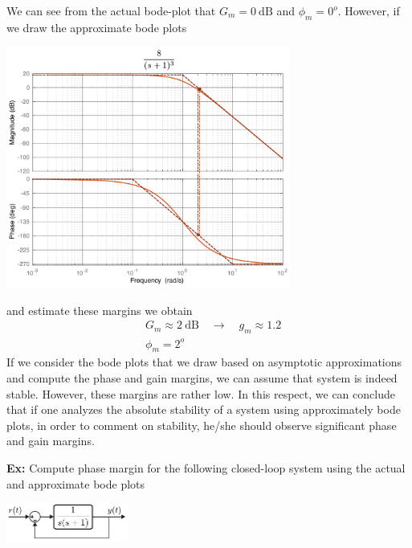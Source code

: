 \documentclass[twoside]{article}
\begin{document}
We can see from the actual bode-plot that  $G_m =  0 \ \mathrm{dB}$
and $\phi_m = 0^o$.
However, if we draw the approximate bode plots 

\begin{center}
\begin{minipage}[h]{\linewidth}
    \begin{center}
      \includegraphics[width=0.7\textwidth]{margin3}
    \end{center}
\end{minipage}
\end{center}

and estimate these margins we obtain
%
\begin{align*}
	&G_m \approx 2 \ \mathrm{dB} \quad \rightarrow \quad g_m \approx 1.2	
	\\
	&\phi_m = 2^o
\end{align*}
%
If we consider the bode plots that we draw based on asymptotic approximations and compute the phase and gain margins, we can assume that system is indeed stable. However, these margins are rather low. In this respect, we can conclude that if one analyzes the absolute stability of a system using approximately bode plots, in order to comment on stability, he/she should observe significant phase and gain margins.

\textbf{Ex:} Compute  phase margin for the following closed-loop system 
using the actual and approximate bode plots

\begin{center}
\begin{minipage}[h]{\linewidth}
    \begin{center}
      \includegraphics[width=0.3\textwidth]{ex4block}
    \end{center}
\end{minipage}
\end{center}
\end{document}
